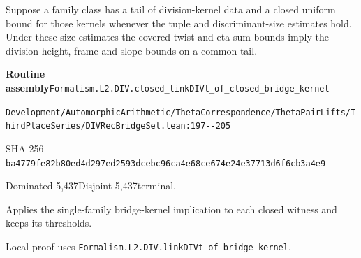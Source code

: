 
\begin{formalstatement}[D481]\label{decomp:D481}
Suppose a family class has a tail of division-kernel data and a closed uniform bound for those kernels whenever the tuple and discriminant-size estimates hold. Under these size estimates the covered-twist and eta-sum bounds imply the division height, frame and slope bounds on a common tail.
\end{formalstatement}
{\small\raggedright\noindent\textsf{\bfseries Routine assembly}\quad \nolinkurl{Formalism.L2.DIV.closed_linkDIVt_of_closed_bridge_kernel}\par\noindent \nolinkurl{Development/AutomorphicArithmetic/ThetaCorrespondence/ThetaPairLifts/ThirdPlaceSeries/DIVRecBridgeSel.lean:197--205}\par\noindent SHA-256 \nolinkurl{ba4779fe82b80ed4d297ed2593dcebc96ca4e68ce674e24e37713d6f6cb3a4e9}\par\noindent Dominated 5,437\quad Disjoint 5,437\quad terminal.\par}
Applies the single-family bridge-kernel implication to each closed witness and keeps its thresholds.
{\small\raggedright Local proof uses \nolinkurl{Formalism.L2.DIV.linkDIVt_of_bridge_kernel}.\par}

